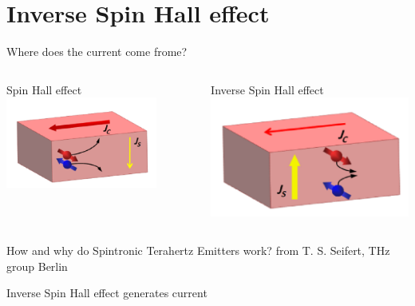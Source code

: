 \documentclass[aspectratio=1610, 9pt]{beamer}
\begin{document}
\section{Inverse Spin Hall effect}
\begin{frame}{Where does the current come frome?}
\begin{center}
\normalsize
\end{center}
\begin{columns}
  \begin{column}{0.5\textwidth}
  Spin Hall effect
  \includegraphics[width=0.8\textwidth]{pics/Spin_Hall.png}
  \end{column}
  \begin{column}{0.5\textwidth}
    Inverse Spin Hall effect
    \includegraphics[width=.8\textwidth]{pics/inv_spin_hall.png}
  \end{column}
\end{columns}
\vspace{.2in}
\small{\textcolor{tugreen}{How and why do Spintronic Terahertz Emitters work?} from T. S. Seifert, THz group Berlin}
\vspace{0.2in}
\begin{center}
  \Large Inverse Spin Hall effect generates current
\end{center}
\end{frame}
\end{document}
